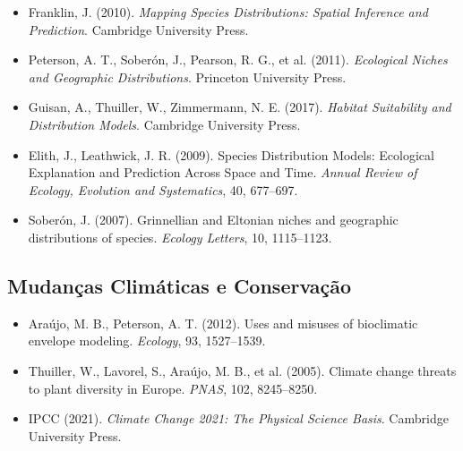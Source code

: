 \begin{itemize}
	
	\item Franklin, J. (2010). \textit{Mapping Species Distributions: Spatial Inference and Prediction}. Cambridge University Press.
	
	\item Peterson, A. T., Soberón, J., Pearson, R. G., et al. (2011). \textit{Ecological Niches and Geographic Distributions}. Princeton University Press.
	
	\item Guisan, A., Thuiller, W., Zimmermann, N. E. (2017). \textit{Habitat Suitability and Distribution Models}. Cambridge University Press.
	
	\item Elith, J., Leathwick, J. R. (2009). Species Distribution Models: Ecological Explanation and Prediction Across Space and Time. \textit{Annual Review of Ecology, Evolution and Systematics}, 40, 677--697.
	
	\item Soberón, J. (2007). Grinnellian and Eltonian niches and geographic distributions of species. \textit{Ecology Letters}, 10, 1115--1123.
	
\end{itemize}

\subsection*{Mudanças Climáticas e Conservação}

\begin{itemize}
	
	\item Araújo, M. B., Peterson, A. T. (2012). Uses and misuses of bioclimatic envelope modeling. \textit{Ecology}, 93, 1527--1539.
	
	\item Thuiller, W., Lavorel, S., Araújo, M. B., et al. (2005). Climate change threats to plant diversity in Europe. \textit{PNAS}, 102, 8245--8250.
	
	\item IPCC (2021). \textit{Climate Change 2021: The Physical Science Basis}. Cambridge University Press.
	
\end{itemize}

